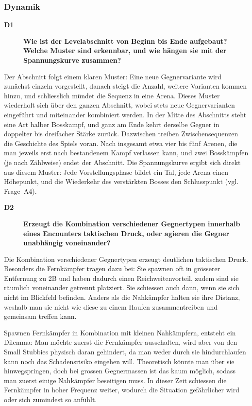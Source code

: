 \documentclass[../Main.tex]{subfiles}
\begin{document}
\subsubsection{Dynamik}

\begin{description}
    \item[\textbf{D1}] \textbf{Wie ist der Levelabschnitt von Beginn bis Ende aufgebaut? Welche Muster sind erkennbar, und wie hängen sie mit der Spannungskurve zusammen?}
\end{description}

Der Abschnitt folgt einem klaren Muster: Eine neue Gegnervariante wird zunächst einzeln vorgestellt, danach steigt die Anzahl, weitere Varianten kommen hinzu, und schliesslich mündet die Sequenz in eine Arena. Dieses Muster wiederholt sich über den ganzen Abschnitt, wobei stets neue Gegnervarianten eingeführt und miteinander kombiniert werden. In der Mitte des Abschnitts steht eine Art halber Bosskampf, und ganz am Ende kehrt derselbe Gegner in doppelter bis dreifacher Stärke zurück. Dazwischen treiben Zwischensequenzen die Geschichte des Spiels voran. Nach insgesamt etwa vier bis fünf Arenen, die man jeweils erst nach bestandenem Kampf verlassen kann, und zwei Bosskämpfen (je nach Zählweise) endet der Abschnitt. Die Spannungskurve ergibt sich direkt aus diesem Muster: Jede Vorstellungsphase bildet ein Tal, jede Arena einen Höhepunkt, und die Wiederkehr des verstärkten Bosses den Schlusspunkt (vgl. Frage~A4).

\begin{description}
    \item[\textbf{D2}] \textbf{Erzeugt die Kombination verschiedener Gegnertypen innerhalb eines Encounters taktischen Druck, oder agieren die Gegner unabhängig voneinander?}
\end{description}

Die Kombination verschiedener Gegnertypen erzeugt deutlichen taktischen Druck. Besonders die Fernkämpfer tragen dazu bei: Sie spawnen oft in grösserer Entfernung zu 2B und haben dadurch einen Reichweitenvorteil, zudem sind sie räumlich voneinander getrennt platziert. Sie schiessen auch dann, wenn sie sich nicht im Blickfeld befinden. Anders als die Nahkämpfer halten sie ihre Distanz, weshalb man sie nicht wie diese zu einem Haufen zusammentreiben und gemeinsam treffen kann.

Spawnen Fernkämpfer in Kombination mit kleinen Nahkämpfern, entsteht ein Dilemma: Man möchte zuerst die Fernkämpfer ausschalten, wird aber von den Small Stubbies physisch daran gehindert, da man weder durch sie hindurchlaufen kann noch das Schadensrisiko eingehen will. Theoretisch könnte man über sie hinwegspringen, doch bei grossen Gegnermassen ist das kaum möglich, sodass man zuerst einige Nahkämpfer beseitigen muss. In dieser Zeit schiessen die Fernkämpfer in hoher Frequenz weiter, wodurch die Situation gefährlicher wird oder sich zumindest so anfühlt.
\end{document}
